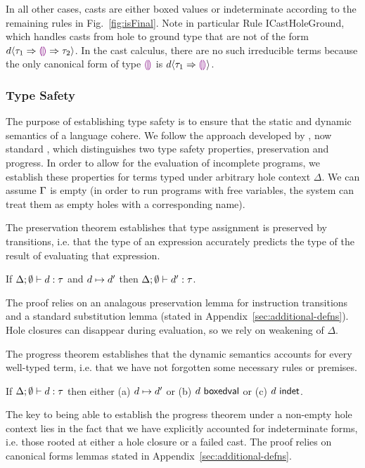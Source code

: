 In all other cases, casts are either boxed values or indeterminate according to the remaining rules in Fig.~\ref{fig:isFinal}. 
Note in particular Rule {ICastHoleGround}, which handles casts from hole to ground type that are not of the form $d \langle{\tau_1}\Rightarrow{\textcolor{violet}{\llparenthesis}\textcolor{violet}{\rrparenthesis}}\Rightarrow{\tau_2}\rangle$. 
In the cast calculus, there are no such irreducible terms because the only canonical form of type $\textcolor{violet}{\llparenthesis}\textcolor{violet}{\rrparenthesis}$ is $d \langle{\tau_1}\Rightarrow{\textcolor{violet}{\llparenthesis}\textcolor{violet}{\rrparenthesis}}\rangle$.

\subsubsection{Type Safety} 
The purpose of establishing type safety is to ensure that the static and dynamic semantics of a language cohere. 
We follow the approach developed by \citet{wright94:_type_soundness}, now standard \cite{pfpl}, which distinguishes two type safety properties, preservation and progress. 
In order to allow for the evaluation of incomplete programs, we establish these properties for terms typed under arbitrary hole context $\Delta$. 
We can assume $\Gamma$ is empty (in order to run programs with free variables, the system can treat them as empty holes with a corresponding name).

The preservation theorem establishes that type assignment is preserved by transitions, i.e. that the type of an expression accurately predicts the type of the result of evaluating that expression.

\begin{thm}[Preservation]
  If $\Delta; \emptyset \vdash d : \tau$ and
  $d \mapsto d'$ then
  $\Delta; \emptyset \vdash d' : \tau$.
\end{thm}
\noindent
The proof relies on an analagous preservation lemma for instruction transitions and a standard substitution lemma (stated in Appendix~\ref{sec:additional-defns}). 
Hole closures can disappear during evaluation, so we rely on weakening of $\Delta$.

The progress theorem establishes that the dynamic semantics accounts for every well-typed term, i.e. that we have not forgotten some necessary rules or premises.
\begin{thm}[Progress]
  If $\Delta; \emptyset \vdash d : \tau$ then either
  (a) $d \mapsto d'$ or
  (b) $d~\mathsf{boxedval}$ or 
  (c) $d~\mathsf{indet}$.
\end{thm}
\noindent
The key to being able to establish the progress theorem under a non-empty hole context lies in the fact that we have explicitly accounted for indeterminate forms, i.e. those rooted at either a hole closure or a failed cast. 
The proof relies on canonical forms lemmas stated in Appendix~\ref{sec:additional-defns}.


